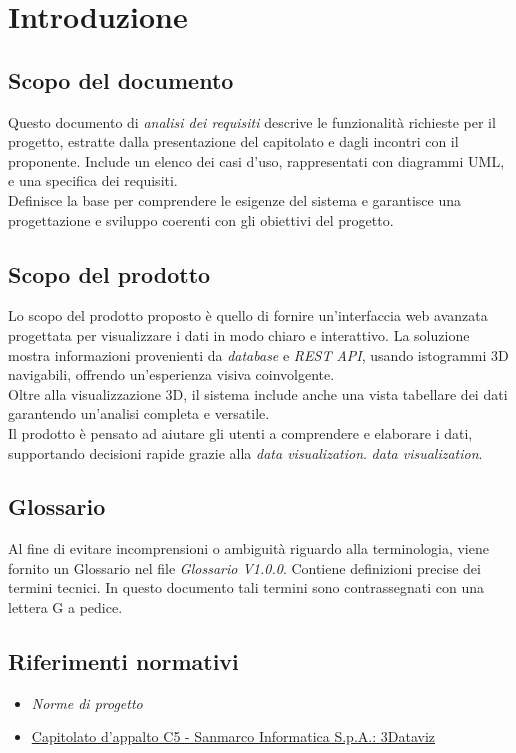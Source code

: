 \section{Introduzione}
\subsection{Scopo del documento}
Questo documento di \textit{analisi dei requisiti} descrive le funzionalità richieste per il progetto, estratte dalla presentazione del capitolato e dagli incontri con il proponente. 
Include un elenco dei casi d'uso, rappresentati con diagrammi UML, e una specifica dei requisiti.\\
Definisce la base per comprendere le esigenze del sistema e garantisce una progettazione e sviluppo coerenti con gli obiettivi del progetto.
\subsection{Scopo del prodotto}
Lo scopo del prodotto proposto è quello di fornire un'interfaccia web avanzata progettata per visualizzare i dati in modo chiaro e interattivo.
La soluzione mostra informazioni provenienti da \textit{database} e \textit{REST API}, usando istogrammi 3D navigabili, offrendo un'esperienza visiva coinvolgente.\\
Oltre alla visualizzazione 3D, il sistema include anche una vista tabellare dei dati garantendo un'analisi completa e versatile.\\
Il prodotto è pensato ad aiutare gli utenti a comprendere e elaborare i dati, supportando decisioni rapide grazie alla \textit{data visualization}.
\textit{data visualization}.
\subsection{Glossario}
Al fine di evitare incomprensioni o ambiguità riguardo alla terminologia, viene fornito un Glossario nel file \textit{Glossario V1.0.0}. Contiene definizioni precise dei termini tecnici. In questo documento tali termini sono contrassegnati con una lettera G a pedice.
\subsection{Riferimenti normativi}
\begin{itemize}
      \item {\textit{Norme di progetto}}
      \item \href{https://www.math.unipd.it/~tullio/IS-1/2024/Progetto/C5.pdf}
            {Capitolato d'appalto C5 - Sanmarco Informatica S.p.A.: 3Dataviz}
\end{itemize}

